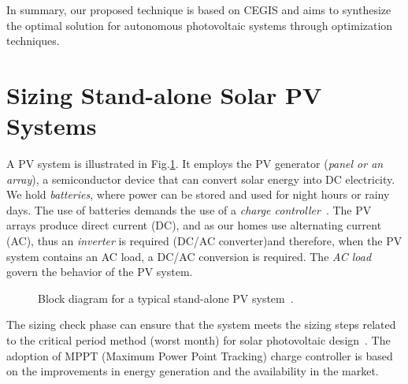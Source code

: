 \documentclass[review]{elsarticle}
\begin{document}
In summary, our proposed technique is based on CEGIS and aims to synthesize the optimal solution for autonomous photovoltaic systems through optimization techniques.

\section{Sizing Stand-alone Solar PV Systems}
\label{sec:sizing}
A PV system is illustrated in Fig.\ref{fig:blockdiagram}. It employs the PV generator (\textit{panel or an array}), a semiconductor device that can convert solar energy into DC electricity. We hold \textit{batteries}, where power can be stored and used for night hours or rainy days. The use of batteries demands the use of a \textit{charge controller}~\citep{Hansen}. The PV arrays produce direct current (DC), and as our homes use alternating current (AC), thus an \textit{inverter} is required (DC/AC converter)and therefore, when the PV system contains an AC load, a DC/AC conversion is required. The \textit{AC load} govern the behavior of the PV system.
%
\begin{figure}[ht]
\centering
\caption{Block diagram for a typical stand-alone PV system~\citep{Hansen}.}
\label{fig:blockdiagram} 
\end{figure}
 
The sizing check phase can ensure that the system meets the sizing steps related to the critical period method (worst month) for solar photovoltaic design~\citep{Pinho}. The adoption of MPPT (Maximum Power Point Tracking) charge controller is based on the improvements in energy generation and the availability in the market. 
 
\end{document}

